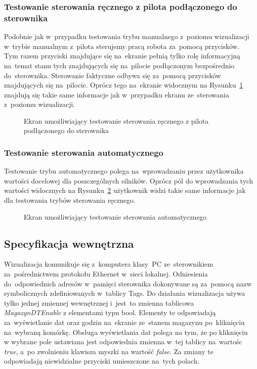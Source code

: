 \subsubsection{Testowanie sterowania ręcznego z pilota podłączonego do sterownika}
Podobnie jak w~przypadku testowania trybu manualnego z~poziomu wizualizacji w~trybie manualnym z~pilota sterujemy pracą robota za~pomocą przycisków. Tym razem przyciski znajdujące się na~ekranie pełnią tylko rolę informacyjną na~temat stanu tych znajdujących się na~pilocie podłączonym bezpośrednio do~sterownika. Sterowanie faktyczne odbywa się za~pomocą przycisków znajdujących się na~pilocie. Oprócz tego na~ekranie widocznym na Rysunku~\ref{vis5} znajdują się takie same informacje jak w~przypadku ekranu ze~sterowania z~poziomu wizualizacji.
\begin{figure}[!htb]
\centering 	
\caption{Ekran umożliwiający testowanie sterowania ręcznego z pilota podłączonego do sterownika} 
\label{vis5}
\end{figure}
\subsubsection{Testowanie sterowania automatycznego}
Testowanie trybu automatycznego polega na~wprowadzaniu przez użytkownika wartości docelowej dla poszczególnych silników. Oprócz pól do wprowadzania tych wartości widocznych na Rysunku~\ref{vis6} użytkownik widzi takie same informacje jak dla testowania trybów sterowania ręcznego.
\begin{figure}[!htb]
\centering 	
\caption{Ekran umożliwiający testowanie sterowania automatycznego} 
\label{vis6}
\end{figure}
\subsection{Specyfikacja wewnętrzna}
Wizualizacja komunikuje się z~komputera klasy~PC ze~sterownikiem za~pośrednictwem protokołu Ethernet w~sieci lokalnej.
Odniesienia do~odpowiednich adresów w~pamięci sterownika dokonywane są za~pomocą nazw symbolicznych zdefiniowanych w~tablicy Tags. Do działania wizualizacja używa tylko jednej zmiennej wewnętrznej i~jest~to zmienna tablicowa \emph{MagazynDTEnable} z elementami typu bool. Elementy te odpowiadają za~wyświetlanie dat oraz godzin na~ekranie ze~stanem magazynu po~kliknięciu na~wybraną komórkę. Obsługa wyświetlania dat polega na tym, że po kliknięciu w wybrane pole ustawiana jest odpowiednia zmienna w~tej tablicy na~wartośc \emph{true}, a~po zwolnieniu klawisza myszki na wartość \emph{false}. Za zmiany te odpowiadają niewidzialne przyciski umieszczone na~tych polach.

